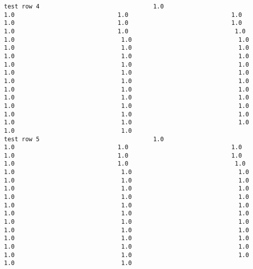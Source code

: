 \documentclass[11pt]{article}
\begin{document}
\begin{verbatim}
test row 4                                1.0                             1.0                             1.0                             1.0                             1.0                             1.0                             1.0                             1.0                             1.0                              1.0                              1.0                              1.0                              1.0                              1.0                              1.0                              1.0                              1.0                              1.0                              1.0                              1.0                              1.0                              1.0                              1.0                              1.0                              1.0                              1.0                              1.0                              1.0                              1.0                              1.0                              1.0                              1.0                              1.0                              1.0                              1.0                              1.0                              1.0                              1.0                              1.0                              1.0                              1.0                              1.0                              1.0                              1.0                              1.0
test row 5                                1.0                             1.0                             1.0                             1.0                             1.0                             1.0                             1.0                             1.0                             1.0                              1.0                              1.0                              1.0                              1.0                              1.0                              1.0                              1.0                              1.0                              1.0                              1.0                              1.0                              1.0                              1.0                              1.0                              1.0                              1.0                              1.0                              1.0                              1.0                              1.0                              1.0                              1.0                              1.0                              1.0                              1.0                              1.0                              1.0                              1.0                              1.0                              1.0                              1.0                              1.0                              1.0                              1.0                              1.0                              1.0

\end{verbatim}
\end{document}
